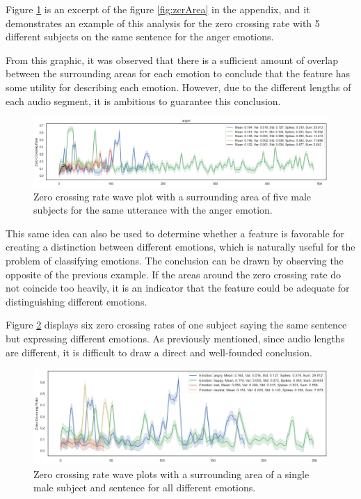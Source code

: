 Figure \ref{fig:zcrAreaOnly1} is an excerpt of the figure \ref{fig:zcrArea} in the appendix, and it demonstrates an example of this analysis for the zero crossing rate with 5 different subjects on the same sentence for the anger emotions.

From this graphic, it was observed that there is a sufficient amount of overlap between the surrounding areas for each emotion to conclude that the feature has some utility for describing each emotion. However, due to the different lengths of each audio segment, it is ambitious to guarantee this conclusion.

\begin{figure}[H]
	\centering
	\includegraphics[width=1\linewidth]{figs/4_1_traditional/zcrAreaOnly1.png}
	\caption{Zero crossing rate wave plot with a surrounding area of five male subjects for the same utterance with the anger emotion.}
	\label{fig:zcrAreaOnly1}
\end{figure}

This same idea can also be used to determine whether a feature is favorable for creating a distinction between different emotions, which is naturally useful for the problem of classifying emotions. The conclusion can be drawn by observing the opposite of the previous example. If the areas around the zero crossing rate do not coincide too heavily, it is an indicator that the feature could be adequate for distinguishing different emotions.

Figure \ref{fig:zcrAreaSameSubj} displays six zero crossing rates of one subject saying the same sentence but expressing different emotions. As previously mentioned, since audio lengths are different, it is difficult to draw a direct and well-founded conclusion.

\begin{figure}[H]
	\centering
	\includegraphics[width=.8\linewidth]{figs/4_1_traditional/zcr_male_same_subject.png}
	\caption{Zero crossing rate wave plots with a surrounding area of a single male subject and sentence for all different emotions.}
	\label{fig:zcrAreaSameSubj}
\end{figure}

